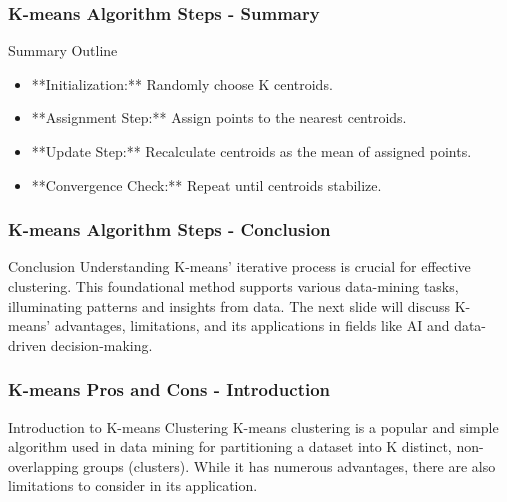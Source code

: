 \documentclass[aspectratio=169]{beamer}
\begin{document}
\begin{frame}[fragile]
    \frametitle{K-means Algorithm Steps - Summary}
    \begin{block}{Summary Outline}
        \begin{itemize}
            \item **Initialization:** Randomly choose K centroids.
            \item **Assignment Step:** Assign points to the nearest centroids.
            \item **Update Step:** Recalculate centroids as the mean of assigned points.
            \item **Convergence Check:** Repeat until centroids stabilize.
        \end{itemize}
    \end{block}
\end{frame}

\begin{frame}[fragile]
    \frametitle{K-means Algorithm Steps - Conclusion}
    \begin{block}{Conclusion}
        Understanding K-means' iterative process is crucial for effective clustering. This foundational method supports various data-mining tasks, illuminating patterns and insights from data. The next slide will discuss K-means' advantages, limitations, and its applications in fields like AI and data-driven decision-making.
    \end{block}
\end{frame}

\begin{frame}[fragile]
    \frametitle{K-means Pros and Cons - Introduction}
    \begin{block}{Introduction to K-means Clustering}
        K-means clustering is a popular and simple algorithm used in data mining for partitioning a dataset into K distinct, non-overlapping groups (clusters).
        While it has numerous advantages, there are also limitations to consider in its application.
    \end{block}
\end{frame}
\end{document}

